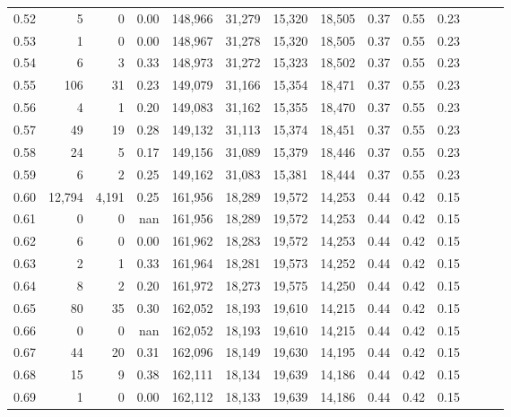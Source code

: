 \begin{tabular}{rrrrrrrrrrrrrr}
0.52 &       5 &      0 &  0.00 &  148,966 &   31,279 &  15,320 &  18,505 &  0.37 &  0.55 &      0.23 \\
0.53 &       1 &      0 &  0.00 &  148,967 &   31,278 &  15,320 &  18,505 &  0.37 &  0.55 &      0.23 \\
0.54 &       6 &      3 &  0.33 &  148,973 &   31,272 &  15,323 &  18,502 &  0.37 &  0.55 &      0.23 \\
0.55 &     106 &     31 &  0.23 &  149,079 &   31,166 &  15,354 &  18,471 &  0.37 &  0.55 &      0.23 \\
0.56 &       4 &      1 &  0.20 &  149,083 &   31,162 &  15,355 &  18,470 &  0.37 &  0.55 &      0.23 \\
0.57 &      49 &     19 &  0.28 &  149,132 &   31,113 &  15,374 &  18,451 &  0.37 &  0.55 &      0.23 \\
0.58 &      24 &      5 &  0.17 &  149,156 &   31,089 &  15,379 &  18,446 &  0.37 &  0.55 &      0.23 \\
0.59 &       6 &      2 &  0.25 &  149,162 &   31,083 &  15,381 &  18,444 &  0.37 &  0.55 &      0.23 \\
0.60 &  12,794 &  4,191 &  0.25 &  161,956 &   18,289 &  19,572 &  14,253 &  0.44 &  0.42 &      0.15 \\
0.61 &       0 &      0 &   nan &  161,956 &   18,289 &  19,572 &  14,253 &  0.44 &  0.42 &      0.15 \\
0.62 &       6 &      0 &  0.00 &  161,962 &   18,283 &  19,572 &  14,253 &  0.44 &  0.42 &      0.15 \\
0.63 &       2 &      1 &  0.33 &  161,964 &   18,281 &  19,573 &  14,252 &  0.44 &  0.42 &      0.15 \\
0.64 &       8 &      2 &  0.20 &  161,972 &   18,273 &  19,575 &  14,250 &  0.44 &  0.42 &      0.15 \\
0.65 &      80 &     35 &  0.30 &  162,052 &   18,193 &  19,610 &  14,215 &  0.44 &  0.42 &      0.15 \\
0.66 &       0 &      0 &   nan &  162,052 &   18,193 &  19,610 &  14,215 &  0.44 &  0.42 &      0.15 \\
0.67 &      44 &     20 &  0.31 &  162,096 &   18,149 &  19,630 &  14,195 &  0.44 &  0.42 &      0.15 \\
0.68 &      15 &      9 &  0.38 &  162,111 &   18,134 &  19,639 &  14,186 &  0.44 &  0.42 &      0.15 \\
0.69 &       1 &      0 &  0.00 &  162,112 &   18,133 &  19,639 &  14,186 &  0.44 &  0.42 &      0.15 \\

\end{tabular}
